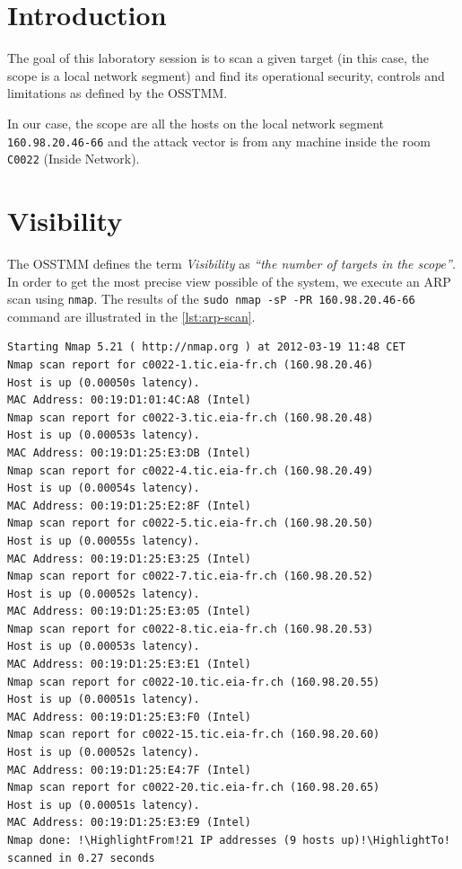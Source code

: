 \documentclass[10pt,a4paper,twoside,onecolumn]{article}
\begin{document}


\cleardoublepage
\setcounter{page}{1}

\section{Introduction}

The goal of this laboratory session is to scan a given target (in this case, the scope is a local network segment) and find its operational security, controls and limitations as defined by the OSSTMM.

In our case, the scope are all the hosts on the local network segment \texttt{160.98.20.46-66} and the attack vector is from any machine inside the room \texttt{C0022} (Inside Network).


\section{Visibility}

The OSSTMM defines the term \textit{Visibility} as \textit{``the number of targets in the scope''}. In order to get the most precise view possible of the system, we execute an ARP scan using \texttt{nmap}. The results of the \texttt{sudo nmap -sP -PR 160.98.20.46-66} command are illustrated in the \autoref{lst:arp-scan}.

\begin{lstlisting}
Starting Nmap 5.21 ( http://nmap.org ) at 2012-03-19 11:48 CET
Nmap scan report for c0022-1.tic.eia-fr.ch (160.98.20.46)
Host is up (0.00050s latency).
MAC Address: 00:19:D1:01:4C:A8 (Intel)
Nmap scan report for c0022-3.tic.eia-fr.ch (160.98.20.48)
Host is up (0.00053s latency).
MAC Address: 00:19:D1:25:E3:DB (Intel)
Nmap scan report for c0022-4.tic.eia-fr.ch (160.98.20.49)
Host is up (0.00054s latency).
MAC Address: 00:19:D1:25:E2:8F (Intel)
Nmap scan report for c0022-5.tic.eia-fr.ch (160.98.20.50)
Host is up (0.00055s latency).
MAC Address: 00:19:D1:25:E3:25 (Intel)
Nmap scan report for c0022-7.tic.eia-fr.ch (160.98.20.52)
Host is up (0.00052s latency).
MAC Address: 00:19:D1:25:E3:05 (Intel)
Nmap scan report for c0022-8.tic.eia-fr.ch (160.98.20.53)
Host is up (0.00053s latency).
MAC Address: 00:19:D1:25:E3:E1 (Intel)
Nmap scan report for c0022-10.tic.eia-fr.ch (160.98.20.55)
Host is up (0.00051s latency).
MAC Address: 00:19:D1:25:E3:F0 (Intel)
Nmap scan report for c0022-15.tic.eia-fr.ch (160.98.20.60)
Host is up (0.00052s latency).
MAC Address: 00:19:D1:25:E4:7F (Intel)
Nmap scan report for c0022-20.tic.eia-fr.ch (160.98.20.65)
Host is up (0.00051s latency).
MAC Address: 00:19:D1:25:E3:E9 (Intel)
Nmap done: !\HighlightFrom!21 IP addresses (9 hosts up)!\HighlightTo! scanned in 0.27 seconds
\end{lstlisting}
\end{document}
